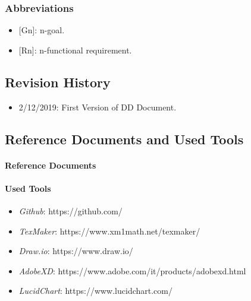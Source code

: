 \documentclass[11pt]{article} %
\begin{document}
\subsubsection{Abbreviations}
\begin{itemize}
\item {}[Gn]: n-goal.
\item {}[Rn]: n-functional requirement.
\end{itemize}

\subsection{Revision History}
\begin{itemize}
\item 2/12/2019: First Version of DD Document.
\end{itemize}

\subsection{Reference Documents and Used Tools}
\paragraph{Reference Documents}


\paragraph{Used Tools}
\begin{itemize}
\item \textit{Github}: https://github.com/
\item \textit{TexMaker}: https://www.xm1math.net/texmaker/
\item \textit{Draw.io}: https://www.draw.io/
\item \textit{AdobeXD}: https://www.adobe.com/it/products/adobexd.html
\item \textit{LucidChart}: https://www.lucidchart.com/
\end{itemize}
\end{document}
